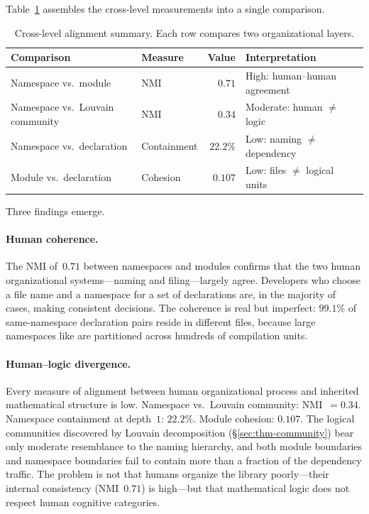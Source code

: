 Table~\ref{tab:three-layers} assembles the cross-level measurements into a single comparison.

\begin{table}[ht]
\centering
\caption{Cross-level alignment summary. Each row compares two organizational layers.}
\label{tab:three-layers}
\begin{tabular}{llrl}
\toprule
Comparison & Measure & Value & Interpretation \\
\midrule
Namespace vs.\ module            & NMI          & $0.71$  & High: human--human agreement \\
Namespace vs.\ Louvain community & NMI          & $0.34$  & Moderate: human $\neq$ logic \\
Namespace vs.\ declaration       & Containment  & $22.2\%$ & Low: naming $\neq$ dependency \\
Module vs.\ declaration          & Cohesion     & $0.107$ & Low: files $\neq$ logical units \\
\bottomrule
\end{tabular}
\end{table}

Three findings emerge.

\paragraph{Human coherence.} The NMI of~$0.71$ between namespaces and modules confirms that the two human organizational systems---naming and filing---largely agree. Developers who choose a file name and a namespace for a set of declarations are, in the majority of cases, making consistent decisions. The coherence is real but imperfect: $99.1\%$ of same-namespace declaration pairs reside in different files, because large namespaces like  are partitioned across hundreds of compilation units.

\paragraph{Human--logic divergence.} Every measure of alignment between human organizational process and inherited mathematical structure is low. Namespace vs.\ Louvain community: NMI~$= 0.34$. Namespace containment at depth~$1$: $22.2\%$. Module cohesion: $0.107$. The logical communities discovered by Louvain decomposition (\S\ref{sec:thm-community}) bear only moderate resemblance to the naming hierarchy, and both module boundaries and namespace boundaries fail to contain more than a fraction of the dependency traffic. The problem is not that humans organize the library poorly---their internal consistency (NMI~$0.71$) is high---but that mathematical logic does not respect human cognitive categories.

